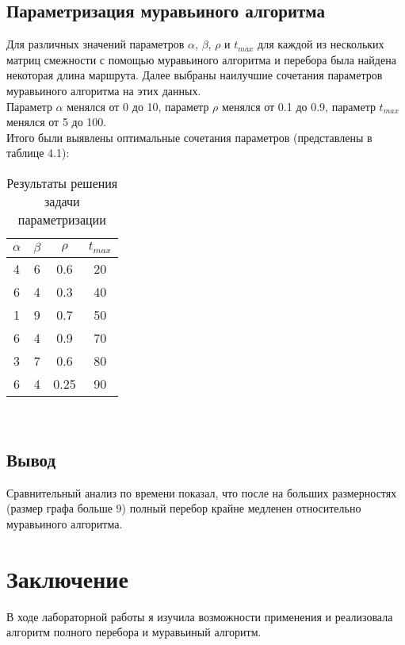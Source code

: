 \documentclass[12pt]{report}
\begin{document}
\section{Параметризация муравьиного алгоритма}	

Для различных значений параметров $\alpha$, $\beta$, $\rho$ и $t_{max}$ для каждой из нескольких матриц смежности с помощью муравьиного алгоритма и перебора была найдена некоторая длина маршрута. Далее выбраны наилучшие сочетания параметров муравьиного алгоритма на этих данных.\\
Параметр $\alpha$ менялся от 0 до 10, параметр $\rho$ менялся от 0.1 до 0.9, параметр $t_{max}$ менялся от 5 до 100.\\
Итого были выявлены оптимальные сочетания параметров (представлены в таблице 4.1):\\

\begin{table}
	\caption{Результаты решения задачи параметризации}
	\begin{center}
		
	\begin{tabular}{|c|c|c|c|}
		\hline
		$\alpha$ &$\beta$ & $\rho$ & $t_{max}$ \\\hline
		4&6&0.6&20\\
		6&4&0.3&40\\
		 1&9&0.7&50\\
		 6&4&0.9&70\\
		 3&7&0.6&80\\
		 6&4&0.25&90\\
		 \hline
	\end{tabular}
\end{center}
\end{table} 
\

\section*{Вывод}
Сравнительный анализ по времени показал, что после на больших размерностях (размер графа больше 9) полный перебор крайне медленен относительно муравьиного алгоритма.



\chapter*{Заключение}
В ходе лабораторной работы я изучила возможности применения и реализовала алгоритм полного перебора и муравьиный алгоритм. 
\end{document}

